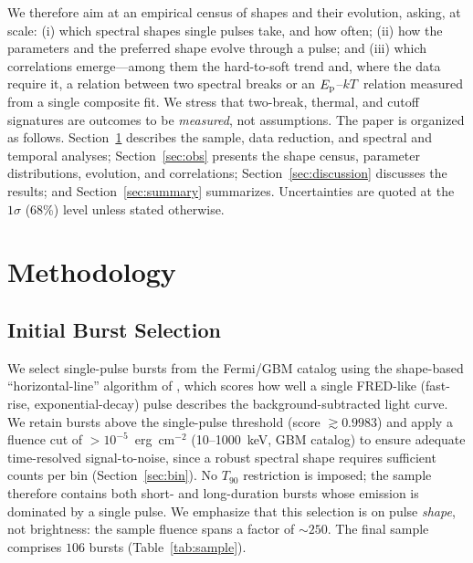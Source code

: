 \documentclass[twocolumn]{aastex631}
\newcommand{\Ep}{\ensuremath{E_{\rm p}}}
\newcommand{\kT}{\ensuremath{kT}}
\begin{document}
We therefore aim at an empirical census of shapes and their evolution, asking, at
scale: (i) which spectral shapes single pulses take, and how often; (ii) how the
parameters and the preferred shape evolve through a pulse; and (iii) which
correlations emerge---among them the hard-to-soft trend \citep{Lu2012,Busby2024}
and, where the data require it, a relation between two spectral breaks or an
\Ep--\kT\ relation measured from a single composite fit. We stress that two-break,
thermal, and cutoff signatures are outcomes to be \emph{measured}, not assumptions.
The paper is organized as follows. Section~\ref{sec:method} describes the sample,
data reduction, and spectral and temporal analyses; Section~\ref{sec:obs} presents
the shape census, parameter distributions, evolution, and correlations;
Section~\ref{sec:discussion} discusses the results; and Section~\ref{sec:summary}
summarizes. Uncertainties are quoted at the $1\sigma$ (68\%) level unless stated
otherwise.

\section{Methodology} \label{sec:method}
\subsection{Initial Burst Selection} \label{sec:sel}
We select single-pulse bursts from the Fermi/GBM catalog
\citep{Meegan2009,Gruber2014} using the shape-based ``horizontal-line'' algorithm
of \citet{Busby2024}, which scores how well a single FRED-like (fast-rise,
exponential-decay) pulse describes the background-subtracted light curve. We retain bursts above the \citeauthor{Busby2024}
single-pulse threshold (score $\gtrsim0.9983$) and apply a fluence cut of
$>$$10^{-5}$~erg~cm$^{-2}$ (10--1000~keV, GBM catalog) to ensure adequate
time-resolved signal-to-noise, since a robust spectral shape requires
sufficient counts per bin (Section~\ref{sec:bin}). No $T_{90}$ restriction is
imposed; the sample therefore contains both short- and long-duration bursts whose
emission is dominated by a single pulse. We emphasize that this selection is on
pulse \emph{shape}, not brightness: the sample fluence spans a factor of
$\sim$$250$. The final sample comprises \textbf{$106$} bursts
(Table~\ref{tab:sample}).
\end{document}
